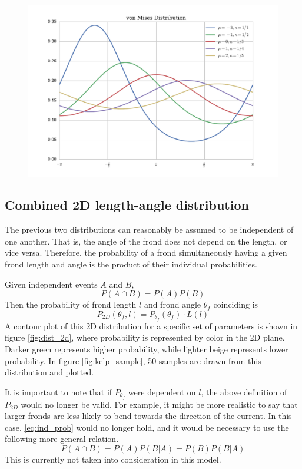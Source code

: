 \begin{figure}[h]
	\centering
	\includegraphics[width=.75\linewidth]{vonmises_2}
	\label{fig:vonmises}
\end{figure}

\subsection{Combined 2D length-angle distribution}
\label{sec:2d_dist}
The previous two distributions can reasonably be assumed to be independent of one another. That is, the angle of the frond does not depend on the length, or vice versa.
Therefore, the probability of a frond simultaneously having a given frond length and angle is the product of their individual probabilities.

Given independent events $A$ and $B$,
\begin{equation}
	\label{eq:ind_prob}
	P(A \cap B) = P(A)P(B)
\end{equation}
Then the probability of frond length $l$ and frond angle $\theta_f$ coinciding is 
\begin{equation}
	P_{2D}(\theta_f,l) = P_{\theta_f}(\theta_f) \cdot L(l)
\end{equation}
A contour plot of this 2D distribution for a specific set of parameters is shown in figure \ref{fig:dist_2d}, where probability is represented by color in the 2D plane.
Darker green represents higher probability, while lighter beige represents lower probability.
In figure \ref{fig:kelp_sample}, 50 samples are drawn from this distribution and plotted.

It is important to note that if $P_{\theta_f}$ were dependent on $l$, the above definition of $P_{2D}$ would no longer be valid.
For example, it might be more realistic to say that larger fronds are less likely to bend towards the direction of the current.
In this case, \eqref{eq:ind_prob} would no longer hold, and it would be necessary to use the following more general relation.
\begin{equation}
	P(A \cap B) = P(A)P(B|A) = P(B)P(B|A)
\end{equation}
This is currently not taken into consideration in this model.


